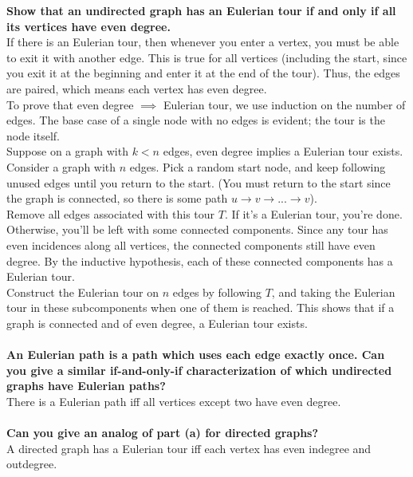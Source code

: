 \newpage
\begin{problem}{3.26}
    \textbf{Show that an undirected graph has an Eulerian tour if and only if all its vertices have even degree.}
    \\
    If there is an Eulerian tour, then whenever you enter a vertex, you must be able to exit it with another edge. This is true for all vertices (including the start, since you exit it at the beginning and enter it at the end of the tour). Thus, the edges are paired, which means each vertex has even degree.
    \\
    To prove that even degree $\implies$ Eulerian tour, we use induction on the number of edges. The base case of a single node with no edges is evident; the tour is the node itself. 
    \\
    Suppose on a graph with $k < n$ edges, even degree implies a Eulerian tour exists. Consider a graph with $n$ edges. Pick a random start node, and keep following unused edges until you return to the start. (You must return to the start since the graph is connected, so there is some path $u \rightarrow v \rightarrow ... \rightarrow v$).
    \\
    Remove all edges associated with this tour $T$. If it's a Eulerian tour, you're done. Otherwise, you'll be left with some connected components. Since any tour has even incidences along all vertices, the connected components still have even degree. By the inductive hypothesis, each of these connected components has a Eulerian tour.
    \\
    Construct the Eulerian tour on $n$ edges by following $T$, and taking the Eulerian tour in these subcomponents when one of them is reached. This shows that if a graph is connected and of even degree, a Eulerian tour exists.
    \\
    \\
    \textbf{An Eulerian path is a path which uses each edge exactly once. Can you give a similar if-and-only-if characterization of which undirected graphs have Eulerian paths?}
    \\
    There is a Eulerian path iff all vertices except two have even degree.
    \\
    \\
    \textbf{Can you give an analog of part (a) for directed graphs?}
    \\
    A directed graph has a Eulerian tour iff each vertex has even indegree and outdegree.
\end{problem}

